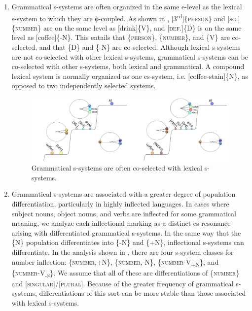 \begin{enumerate}
\item Grammatical s-systems are often organized in the same e-level as the lexical s-system to which they are ϕ-coupled. As shown in {}, [3\textsuperscript{rd}]\{\textsc{person}\} and [\textsc{sg.}]\{\textsc{number}\} are on the same level as [drink]\{V\}, and [\textsc{def}.]\{D\} is on the same level as [coffee]\{-N\}. This entails that \{\textsc{person}\}, \{\textsc{number}\}, and \{V\} are co-selected, and that \{D\} and \{-N\} are co-selected. Although lexical s-systems are not co-selected with other lexical s-systems, grammatical s-systems can be co-selected with other s-systems, both lexical and grammatical. A compound lexical system is normally organized as one cs-system, i.e. [coffee-stain]\{N\}, as opposed to two independently selected systems.

  
\begin{figure}
\includegraphics[width=\textwidth]{figures/Tilsen-img66.png}
\caption{Grammatical s-systems are often co-selected with lexical s-systems.}
\label{fig:4:16}
\end{figure}
 

\item  Grammatical s-systems are associated with a greater degree of population differentiation, particularly in highly inflected languages. In cases where subject nouns, object nouns, and verbs are inflected for some grammatical meaning, we analyze each inflectional marking as a distinct cs-resonance arising with differentiated grammatical s-systems. In the same way that the \{N\} population differentiates into \{-N\} and \{+N\}, inflectional s-systems can differentiate. In the analysis shown in {}, there are four s-system classes for number inflection: \{\textsc{number},+N\}, \{\textsc{number},-N\}, \{\textsc{number}{}-\textsc{V}\textsc{\textsubscript{+N}}\textsc{\}}, and  \{\textsc{number}{}-\textsc{V}\textsc{\textsubscript{{}-n}}\textsc{\}}. We assume that all of these are differentiations of \{\textsc{number}\} and [\textsc{singular}]/[\textsc{plural}]. Because of the greater frequency of grammatical s-systems, differentiations of this sort can be more stable than those associated with lexical s-systems. 


\end{enumerate}

